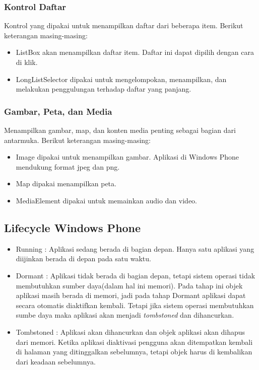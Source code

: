 \subsubsection{Kontrol Daftar}
\label{subsubsec:Kontrol Daftar}
\hspace{0.5cm} Kontrol yang dipakai untuk menampilkan daftar dari beberapa item. Berikut keterangan masing-masing:

\begin{itemize}
	\item ListBox akan menampilkan daftar item. Daftar ini dapat dipilih dengan cara di klik.
	\item LongListSelector dipakai untuk mengelompokan, menampilkan, dan melakukan penggulungan terhadap daftar yang panjang.
\end{itemize}

\subsubsection{Gambar, Peta, dan Media}
\label{subsubsec:Gambar, Peta, dan Media}
\hspace{0.5cm} Menampilkan gambar, map, dan konten media penting sebagai bagian dari antarmuka. Berikut keterangan masing-masing:

\begin{itemize}
	\item Image dipakai untuk menampilkan gambar. Aplikasi di Windows Phone mendukung format jpeg dan png. 
	\item Map dipakai menampilkan peta.
	\item MediaElement dipakai untuk memainkan audio dan video.
\end{itemize}

\subsection{Lifecycle Windows Phone}
\label{subsec:Lifecycle Windows Phone}

\begin{itemize}
	\item Running : Aplikasi sedang berada di bagian depan. Hanya satu aplikasi yang diijinkan berada di depan pada satu waktu.
	\item Dormant : Aplikasi tidak berada di bagian depan, tetapi sistem operasi tidak membutuhkan sumber daya(dalam hal ini memori). Pada tahap ini objek aplikasi masih berada di memori, jadi pada tahap Dormant aplikasi dapat secara otomatis diaktifkan kembali. Tetapi jika sistem operasi  membutuhkan sumbe daya maka aplikasi akan menjadi \textit{tombstoned} dan dihancurkan. 
	\item Tombstoned : Aplikasi akan dihancurkan dan objek aplikasi akan dihapus dari memori. Ketika aplikasi diaktivasi pengguna akan ditempatkan kembali di halaman yang ditinggalkan sebelumnya, tetapi objek harus di kembalikan dari keadaan sebelumnya.
\end{itemize}

